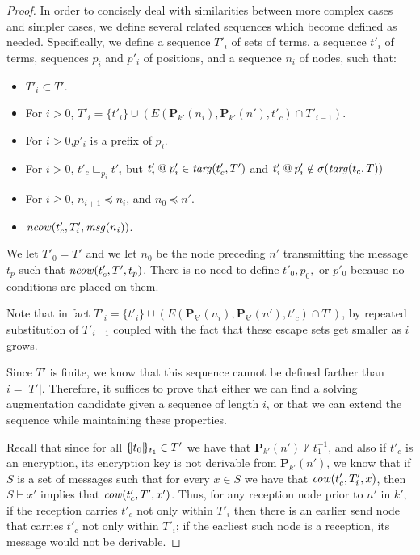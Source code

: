 \documentclass[12pt]{article}
\theoremstyle{definition}
\newcommand{\pubmsg}{\mathbf{P}}
\newcommand{\mcow}{\fn{cow}}
\newcommand{\mncow}{\fn{ncow}}
\newcommand{\msg}{\fn{msg}}
\begin{document}
\begin{proof}
In order to concisely deal with similarities between more complex cases and simpler cases, we define several
related sequences which become defined as needed.  Specifically, we define a sequence $T'_i$ of sets of terms,
a sequence $t'_i$ of terms, sequences $p_i$ and $p'_i$ of positions, and a sequence $n_i$ of nodes, such that:

\begin{itemize}
\item $T'_i \subset T'$.
\item For $i > 0$, $T'_i = \{t'_i\} \cup (E(\pubmsg_{k'}(n_i),\pubmsg_{k'}(n'),t'_c) \cap T'_{i-1})$.
\item For $i > 0$,$p'_i$ is a prefix of $p_i$.
\item For $i > 0$, $t'_c \sqsubseteq_{p_i} t'_i$ but $t'_i \mathbin{@} p'_i \in \operatorname{\mathit{targ}}(t'_c, T')$ and $t'_i \mathbin{@} p'_i \notin \sigma(\operatorname{\mathit{targ}}
(t_c, T))$
\item For $i \geq 0$, $n_{i+1} \preceq n_i$, and $n_0 \preceq n'$.
\item $\mncow(t'_c, T'_i, \msg(n_i))$.
\end{itemize}

We let $T'_0 = T'$ and we let $n_0$ be the node preceding $n'$ transmitting the message $t_p$ such that $\mncow(t'_c,T',t_p)$.
There is no need to define $t'_0, p_0,$ or $p'_0$ because no conditions are placed on them.

Note that in fact $T'_i = \{t'_i\} \cup (E(\pubmsg_{k'}(n_i),\pubmsg_{k'}(n'),t'_c) \cap T')$, by repeated
substitution of $T'_{i-1}$ coupled with the fact that these escape sets get smaller as $i$ grows.

Since $T'$ is finite, we know that this sequence cannot be defined farther than $i = |T'|$.  Therefore, it suffices to prove
that either we can find a solving augmentation candidate given a sequence of length $i$, or that we can extend the sequence
while maintaining these properties.

Recall that since for all $\{\!|t_0|\!\}_{t_1} \in T'$ we have that $\pubmsg_{k'}(n') \not\vdash t_1^{-1}$, and
also if $t'_c$ is an encryption, its encryption key is not derivable from $\pubmsg_{k'}(n')$, we know that if
$S$ is a set of messages such that for every $x \in S$ we have that $\mcow(t'_c,T'_i,x)$, then $S \vdash x'$ implies
that $\mcow(t'_c,T',x')$.  Thus, for any reception node prior to $n'$ in $k'$, if the reception carries
$t'_c$ not only within $T'_i$ then there is an earlier send node that carries $t'_c$ not only within $T'_i$; if the
earliest such node is a reception, its message would not be derivable.


\end{proof}
\end{document}
